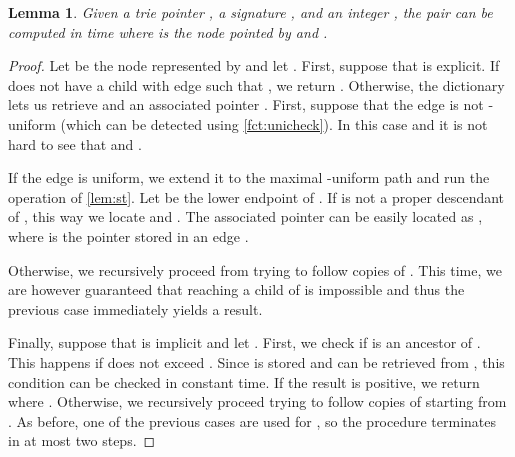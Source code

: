 \documentclass[a4paper]{article}
\newtheorem{lemma}[theorem]{Lemma}
\theoremstyle{remark}
\begin{document}
\begin{lemma}\label{lem:down}
  Given a trie pointer , a signature , and an integer , the pair 
can be computed in  time where  is the node  pointed by 
and .
\end{lemma}
\begin{proof}
Let  be the node represented by  and let .
First, suppose that  is explicit.
If  does not have a child  with edge  such that , we return .
Otherwise, the dictionary lets us retrieve  and an associated pointer .
First, suppose that the edge is not -uniform (which can be detected using \cref{fct:unicheck}).
In this case  and it is not hard to see that 
and .

If the edge is uniform, we extend it to the maximal -uniform path 
and run the \linebreak
 operation of \cref{lem:st}.
Let  be the lower endpoint of . If  is not a proper descendant
of , this way we locate  and .
The associated pointer can be easily located as
,
where  is the pointer stored in an edge .

Otherwise, we recursively proceed from  trying to follow 
copies of . This time, we are however guaranteed that reaching a child of  is impossible and
thus the previous case immediately yields a result.

Finally, suppose that  is implicit and let .
First, we check if  is an ancestor of .
This happens if  does not exceed .
Since  is stored and  can be retrieved from ,
this condition can be checked in constant time. If the result is positive, we return 
where .
Otherwise, we recursively proceed trying to follow  copies
of  starting from . As before, one of the previous cases are used for ,
so the procedure terminates in at most two steps.
\end{proof}
\end{document}
